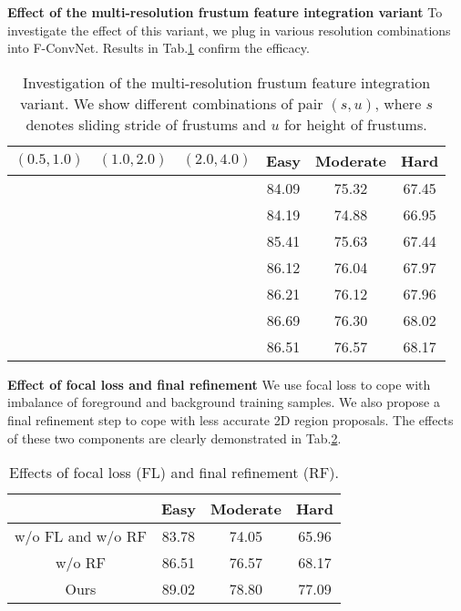 \documentclass[letterpaper, 10 pt, conference]{ieeeconf}
\begin{document}
\vspace{0.1cm}
\label{Sec:Multi-Resolution}
\noindent\textbf{Effect of the multi-resolution frustum feature integration variant} To investigate the effect of this variant, we plug in various resolution combinations into F-ConvNet. Results in Tab.\ref{Tab:MultiResolution} confirm the efficacy.



\begin{table}[ht]
	\begin{center}
	\begin{tabular}{ccc|ccc}
		\hline
		$(0.5, 1.0)$ & $(1.0, 2.0)$ & $(2.0, 4.0)$ & Easy  & Moderate & Hard  \\ \hline
		             &              &              & 84.09 & 75.32    & 67.45 \\
		\checkmark   &              &              & 84.19 & 74.88    & 66.95 \\
		             & \checkmark   &              & 85.41 & 75.63    & 67.44 \\
		             &              & \checkmark   & 86.12 & 76.04    & 67.97 \\
		\checkmark   & \checkmark   &              & 86.21 & 76.12    & 67.96 \\
		             & \checkmark   & \checkmark   & 86.69 & 76.30    & 68.02 \\
		\checkmark   & \checkmark   & \checkmark   & 86.51 & 76.57    & 68.17 \\
		\hline
	\end{tabular}
	\caption{Investigation of the multi-resolution frustum feature integration variant. We show different combinations of pair $(s, u)$, where $s$ denotes sliding stride of frustums and $u$ for height of frustums. }
	\label{Tab:MultiResolution}
	\end{center}
	\vspace{-0.5cm}
\end{table}

\noindent\textbf{Effect of focal loss and final refinement} We use focal loss\cite{lin2017focal} to cope with imbalance of foreground and background training samples. We also propose a final refinement step to cope with less accurate 2D region proposals. The effects of these two components are clearly demonstrated in Tab.\ref{Tab:FocalLoss}.

\begin{table}[ht]
	\begin{center}
		\begin{tabular}{c|ccc}
			\hline
			                  & Easy  & Moderate & Hard  \\ \hline
			w/o FL and w/o RF & 83.78 & 74.05    & 65.96 \\
			w/o RF            & 86.51 & 76.57    & 68.17 \\
			Ours              & 89.02 & 78.80    & 77.09 \\ \hline
		\end{tabular}
		\caption{Effects of focal loss (FL) and final refinement (RF).}
		\label{Tab:FocalLoss}	
	\end{center}
	\vspace{-0.5cm}
\end{table}
\end{document}
